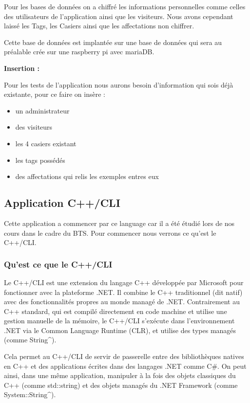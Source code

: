 \documentclass[main.tex]{subfiles}
\begin{document}
Pour les bases de données on a chiffré les informations personnelles comme celles des utilisateurs de l’application ainsi que les visiteurs. Nous avons cependant laissé les Tags, les Casiers ainsi que les affectations non chiffrer. 

Cette base de données est implantée sur une base de données qui sera au préalable crée sur une raspberry pi avec mariaDB. 

\textbf{Insertion :}

Pour les tests de l'application nous aurons besoin d'information qui sois déjà existante, pour ce faire on insère :

\begin{itemize}
\item un administrateur
\item des visiteurs 
\item les 4 casiers existant
\item les tags possédés 
\item des affectations qui relis les exemples entres eux
\end{itemize}


\subsection{Application C++/CLI}

Cette application a commencer par ce language car il a été étudié lors de nos cours dans le cadre du BTS. Pour commencer nous verrons ce qu'est le C++/CLI.

\subsubsection{Qu'est ce que le C++/CLI}

Le C++/CLI est une extension du langage C++ développée par Microsoft pour fonctionner avec la plateforme .NET. Il combine le C++ traditionnel (dit natif) avec des fonctionnalités propres au monde managé de .NET. Contrairement au C++ standard, qui est compilé directement en code machine et utilise une gestion manuelle de la mémoire, le C++/CLI s'exécute dans l’environnement .NET via le Common Language Runtime (CLR), et utilise des types managés (comme String\^{}).

Cela permet au C++/CLI de servir de passerelle entre des bibliothèques natives en C++ et des applications écrites dans des langages .NET comme C\#. On peut ainsi, dans une même application, manipuler à la fois des objets classiques du C++ (comme std::string) et des objets managés du .NET Framework (comme System::String\^{}).
\end{document}
